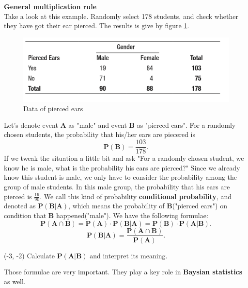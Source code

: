\documentclass[a4paper, 12pt,twoside]{book}
\begin{document}
\noindent
\textbf{General multiplication rule}
\vspace{0.3cm}\\
Take a look at this example. Randomly select 178 students, and check whether they have got their ear pierced. The results is give by figure \ref{EarPierced}.
    \begin{figure}[H]
        \centering
        \includegraphics[scale=0.6]{EarPierced}
        \caption{Data of pierced ears}
        \label{EarPierced}
    \end{figure}
Let's denote event \textbf{A} as "male" and event \textbf{B} as "pierced ears". For a randomly chosen students, the probability that his/her ears are piecered is $$\textbf{P}(\textbf{B}) = \frac{103}{178}.$$
If we tweak the situation a little bit and ask "For a randomly chosen student, we know he is male, what is the probability his ears are pierced?" Since we already know this student is male, we only have to consider the probability among the group of male students. In this male group, the probability that his ears are pierced is $\displaystyle{\frac{19}{90}}$. We call this kind of probability \textbf{conditional probability}, and denoted as $\textbf{P}(\textbf{B}|\textbf{A})$, which means the probability of \textbf{B}("pierced ears") on condition that \textbf{B} happened("male"). We have the following formulae:
$$\textbf{P}(\textbf{A} \cap \textbf{B}) = \textbf{P}(\textbf{A}) \cdot \textbf{P}(\textbf{B}|\textbf{A})= \textbf{P}(\textbf{B}) \cdot \textbf{P}(\textbf{A}|\textbf{B}).$$
$$\textbf{P}(\textbf{B}|\textbf{A}) = \frac{\textbf{P}(\textbf{A} \cap \textbf{B})}{\textbf{P}(\textbf{A})}.$$

\begin{textblock}{4}(-3, -2)
\textcolor{dollarbill}
Calculate $\textbf{P}(\textbf{A}|\textbf{B})$ and interpret its meaning.
\end{textblock}

\hspace{-0.5cm}
\colorbox{babypink}{\parbox{\textwidth}{
  Those formulae are very important. They play a key role in \textbf{Baysian statistics} as well.
}}
\vspace{0.6cm}
\end{document}
